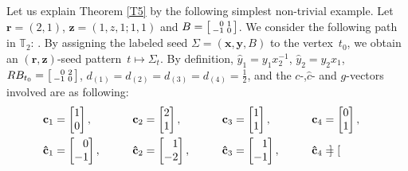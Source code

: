 \documentclass[pdftex]{sigma}
\numberwithin{equation}{section}
\begin{document}
\begin{Example}
\label{EX1}
Let us explain Theorem \ref{T5} by the following simplest non-trivial example. Let~${\mathbf{r}=(2,1)}$, $\mathbf{z}=(1,z,1;1,1)$ and $B=\left[\begin{smallmatrix}
 \hphantom{-}0 & 1\\
 -1 & 0
 \end{smallmatrix}\right]$. We consider the following path in $\mathbb{T}_2$:
.
 By assigning the labeled seed $\Sigma=(\mathbf{x},\mathbf{y},B)$ to the vertex~$t_0$, we obtain an $(\mathbf{r},\mathbf{z})$-seed pattern~${t\mapsto \Sigma_t}$.
By definition, $\hat{y}_1=y_1x_2^{-1}$, $\hat{y}_2=y_2x_1$, $RB_{t_0}=\left[\begin{smallmatrix}
 \hphantom{-}0 & 2 \\
 -1 & 0
 \end{smallmatrix}\right]$, $d_{(1)}=d_{(2)}=d_{(3)}=d_{(4)}=\frac{1}{2}$, and the $c$-,$\hat{c}$- and $g$-vectors involved are as following:
 \begin{alignat*}{5}
 &\mathbf{c}_{1}=\begin{bmatrix}
 1\\0
 \end{bmatrix}, \qquad&&
 \mathbf{c}_{2}=\begin{bmatrix}
 2\\1
 \end{bmatrix},\qquad&&
 \mathbf{c}_{3}=\begin{bmatrix}
 1\\1
 \end{bmatrix},\qquad&&
 \mathbf{c}_{4}=\begin{bmatrix}
 0\\1
 \end{bmatrix},&\\
 &\mathbf{\hat{c}}_{1}=\begin{bmatrix}
 \hphantom{-}0\\-1
 \end{bmatrix},\qquad&&
 \mathbf{\hat{c}}_{2}=\begin{bmatrix}
 \hphantom{-}1\\-2
 \end{bmatrix},\qquad&&
 \mathbf{\hat{c}}_{3}=\begin{bmatrix}
 \hphantom{-}1\\-1
 \end{bmatrix},\qquad&&
 \mathbf{\hat{c}}_{4}=\begin{bmatrix}

\end{bmatrix}
\end{alignat*}
\end{Example}
\end{document}
